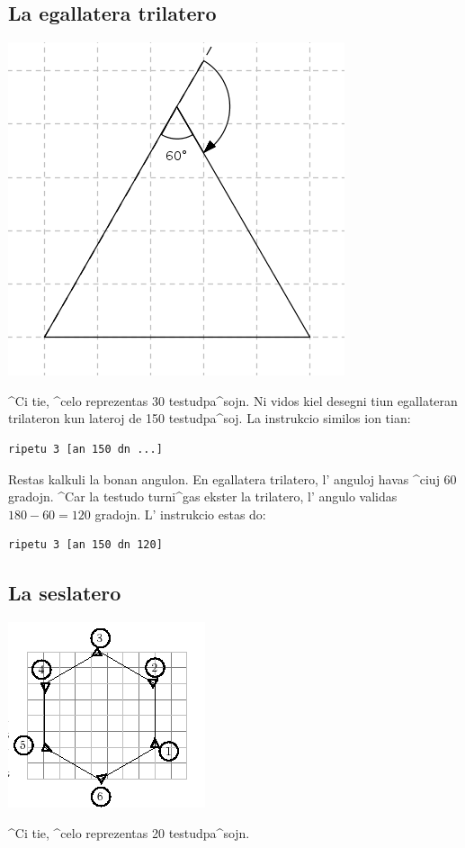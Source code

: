 \subsection{La egallatera trilatero}
\begin{center}
\includegraphics{bildoj/bases-triangle.png}
\end{center}
\noindent ^Ci tie, ^celo reprezentas 30 testudpa^sojn.  Ni vidos kiel
desegni tiun egallateran trilateron kun lateroj de 150 testudpa^soj.
La instrukcio similos ion tian:
\begin{verbatim}
ripetu 3 [an 150 dn ...]
\end{verbatim}
Restas kalkuli la bonan angulon.  En egallatera trilatero, l' anguloj
havas ^ciuj 60 gradojn.  ^Car la testudo turni^gas ekster la
trilatero, l' angulo validas $180-60=120$ gradojn.  L' instrukcio estas
do:
\begin{verbatim}
ripetu 3 [an 150 dn 120]
\end{verbatim}
\subsection{La seslatero}
\begin{center}
\includegraphics{bildoj/bases-hexagone.png}
\end{center}
\noindent ^Ci tie, ^celo reprezentas 20 testudpa^sojn.

